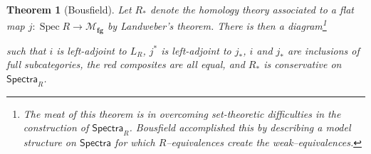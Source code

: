 \documentclass{amsart}
\newcommand{\M}{\mathcal{M}}
\newcommand{\<}{\langle}
\renewcommand{\>}{\rangle}
\newcommand{\CatOf}[1]{\mathsf{#1}}
\newcommand{\moduli}[1]{\mathcal{M}_{\mathbf{#1}}}
\DeclareMathOperator{\Spec}{Spec}
\theoremstyle{plain}
\newtheorem*{theorem}{Theorem}
\theoremstyle{definition}
\theoremstyle{remark}
\begin{document}
\begin{theorem}[Bousfield]
Let $R_*$ denote the homology theory associated to a flat map $j: \Spec R \to \moduli{fg}$ by Landweber's theorem.  There is then a diagram\footnote{The meat of this theorem is in overcoming set-theoretic difficulties in the construction of $\CatOf{Spectra}_R$.  Bousfield accomplished this by describing a model structure on $\CatOf{Spectra}$ for which $R$--equivalences create the weak--equivalences.}
\begin{center}
\end{center}
such that $i$ is left-adjoint to $L_R$, $j^*$ is left-adjoint to $j_*$, $i$ and $j_*$ are inclusions of full subcategories, the red composites are all equal, and $R_*$ is conservative on $\CatOf{Spectra}_R$.
\end{theorem}
\end{document}
